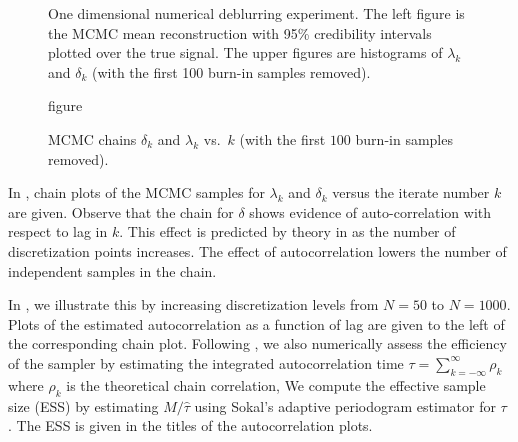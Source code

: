 \documentclass{article}
\begin{document}
\begin{figure}
  \caption{figure}{One dimensional numerical deblurring experiment. The left figure is the  MCMC mean reconstruction with 95\% credibility intervals  plotted over the true signal. 
    The upper figures are histograms of $\lambda_k$ and $\delta_k$ (with the first 100 burn-in samples removed). 
  }\label{naive_gibbs_recon}
\end{figure}

\begin{figure}
  \caption{
    MCMC chains $\delta_k$ and $\lambda_k$ vs.~$k$ (with the first $100$ burn-in samples removed). 
  }\label{naive_gibbs_mcmc}
\end{figure}

In , chain plots of the MCMC samples for $\lambda_k$ and $\delta_k$ versus the iterate number $k$ are given.  
Observe that the chain for $\delta$ shows evidence of auto-correlation with respect to lag in $k$. 
This effect is predicted by theory in \cite{agapiou2014analysis} as the number of discretization points increases. 
The effect of autocorrelation lowers the number of independent samples in the chain.  

In , we illustrate this by increasing discretization levels from $N=50$ to $N=1000$.  
Plots of the estimated autocorrelation as a function of lag are given to the left of the corresponding chain plot. 
Following \cite{sokal1989monte} \cite{green1992metropolis}, we also numerically assess the efficiency of the sampler by estimating the integrated autocorrelation time $ \tau = \sum_{k=-\infty}^\infty \rho_k$ where $\rho_k$ is the theoretical chain correlation,
We compute the effective sample size (ESS) by estimating $M / \hat\tau$ using Sokal's adaptive periodogram estimator for $\tau$ \cite{sokal1989monte}.  
The ESS is given in the titles of the autocorrelation plots.
\end{document}
